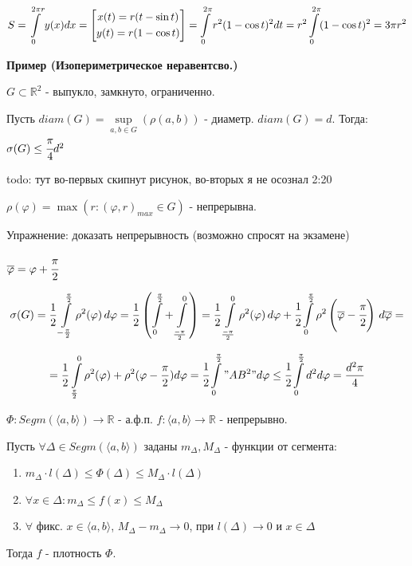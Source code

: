 $S  = \displaystyle\int\limits_{0}^{2\pi r}y(x)dx  = \left [ \begin{gathered}
    x(t) = r(t-\sin t) \\
    y(t) = r(1-\cos t)
\end{gathered}\right] = \displaystyle\int\limits_{0}^{2\pi}r^2(1-\cos t)^2 dt = r^2\displaystyle\int\limits_{0}^{2\pi}(1-\cos t)^2 = 3 \pi r^2$


\textbf{Пример (Изопериметрическое неравентсво.)}

$G \subset \mathbb{R}^2$ - выпукло, замкнуто, ограниченно. 

Пусть $diam(G) = \sup\limits_{a,b\in G} (\rho(a,b))$ - диаметр. $diam(G) = d$. Тогда: $\sigma(G)\leq \cfrac{\pi}{4}d^2$

todo: тут во-первых скипнут рисунок, во-вторых я не осознал 2:20

$\rho(\varphi) = \max (r: (\varphi,r)_{max} \in G)$ -  непрерывна.

Упражнение: доказать непрерывность (возможно спросят на экзамене)

$\overline{\varphi} = \varphi + \cfrac{\pi}{2}$

$$\sigma(G)= \frac{1}{2}\displaystyle\int\limits_{-\frac{\pi}{2}}^{\frac{\pi}{2}}\rho^2(\varphi)\,d\varphi = \frac{1}{2}\left(\displaystyle\int\limits_{0}^{\frac{\pi}{2}} + \displaystyle\int\limits_{\frac{-\pi}{2}}^{0}\right) = \frac{1}{2}\displaystyle\int\limits_{\frac{-\pi}{2}}^{0}\rho^2(\varphi)\, d \varphi  + \cfrac{1}{2}\displaystyle\int\limits_{0}^{\frac{\pi}{2}}\rho^2\left(\overline{\varphi}-\cfrac{\pi}{2}\right)\,
d\overline{\varphi}=$$

$$=\frac{1}{2}\displaystyle\int\limits_{\frac{\pi}{2}}^{0}\rho^2(\varphi) + \rho^2(\varphi - \frac{\pi}{2}) d\varphi = \cfrac{1}{2}\displaystyle\int\limits_{0}^{\frac{\pi}{2}}"AB^2" d\varphi \leq \cfrac{1}{2}\displaystyle\int\limits_{0}^{\frac{\pi}{2}}d^2 d\varphi = \frac{d^2\pi}{4}$$


$\varPhi: Segm(\langle a,b\rangle) \rightarrow \mathbb{R}$ - а.ф.п. $f: \langle a,b \rangle \rightarrow \mathbb{R}$ - непрерывно.

Пусть $\forall\Delta \in Segm(\langle a,b \rangle)$ заданы $m_\Delta, M_{\Delta} $ - функции от сегмента:

\begin{enumerate}
    \item $m_\Delta\cdot l(\Delta) \leq \varPhi(\Delta) \leq M_{\Delta} \cdot l(\Delta)$
    \item $\forall x  \in \Delta: m_{\Delta}\leq f(x)\leq M_{\Delta}$
    \item $\forall$ фикс. $x\in \langle a,b \rangle$, $M_{\Delta}-m_{\Delta}\rightarrow 0$, при $l(\Delta)\rightarrow 0 $ и $x\in \Delta$ 
\end{enumerate}
Тогда $f$ - плотность $\varPhi$. 

